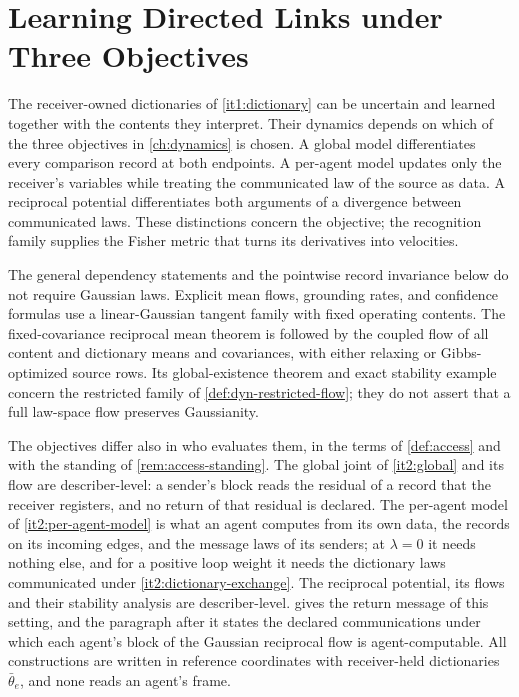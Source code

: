 \chapter{Learning Directed Links under Three Objectives}
\label{ch:link-dynamics}

The receiver-owned dictionaries of \cref{it1:dictionary} can be uncertain and learned together with the contents they interpret. Their dynamics depends on which of the three objectives in \cref{ch:dynamics} is chosen. A global model differentiates every comparison record at both endpoints. A per-agent model updates only the receiver's variables while treating the communicated law of the source as data. A reciprocal potential differentiates both arguments of a divergence between communicated laws. These distinctions concern the objective; the recognition family supplies the Fisher metric that turns its derivatives into velocities.

The general dependency statements and the pointwise record invariance below do not require Gaussian laws. Explicit mean flows, grounding rates, and confidence formulas use a linear-Gaussian tangent family with fixed operating contents. The fixed-covariance reciprocal mean theorem is followed by the coupled flow of all content and dictionary means and covariances, with either relaxing or Gibbs-optimized source rows. Its global-existence theorem and exact stability example concern the restricted family of \cref{def:dyn-restricted-flow}; they do not assert that a full law-space flow preserves Gaussianity.

The objectives differ also in who evaluates them, in the terms of \cref{def:access} and with the standing of \cref{rem:access-standing}. The global joint of \cref{it2:global} and its flow are describer-level: a sender's block reads the residual of a record that the receiver registers, and no return of that residual is declared. The per-agent model of \cref{it2:per-agent-model} is what an agent computes from its own data, the records on its incoming edges, and the message laws of its senders; at $\lambda=0$ it needs nothing else, and for a positive loop weight it needs the dictionary laws communicated under \cref{it2:dictionary-exchange}. The reciprocal potential, its flows and their stability analysis are describer-level.  gives the return message of this setting, and the paragraph after it states the declared communications under which each agent's block of the Gaussian reciprocal flow is agent-computable. All constructions are written in reference coordinates with receiver-held dictionaries $\bar\theta_e$, and none reads an agent's frame.

